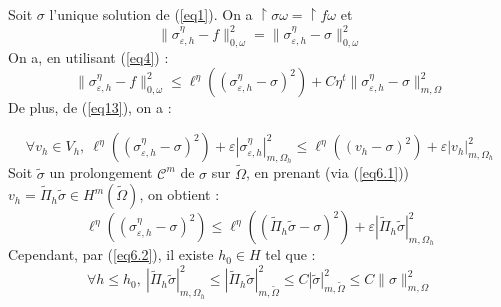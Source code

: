 \documentclass{article}
\begin{document}
\begin{dem}
Soit $\sigma$ l'unique solution de (\ref{eq1}). On a $\restriction{\sigma}{\omega}=\restriction{f}{\omega}$ et
	\[\|\sigma_{\varepsilon,h}^\eta -f\|_{0,\omega}^2=\|\sigma_{\varepsilon,h}^\eta -\sigma\|_{0,\omega}^2\]
On a, en utilisant (\ref{eq4}) : 
\begin{equation} \label{eq15} \|\sigma_{\varepsilon,h}^\eta -f\|_{0,\omega}^2\leq \ell^\eta \left( \left(\sigma_{\varepsilon, h}^\eta -\sigma\right)^2\right) + C\eta^t \|\sigma_{\varepsilon, h}^\eta -\sigma\|_{m,\Omega}^2 \end{equation}
De plus, de (\ref{eq13}), on a :

\begin{equation} \label{eq16} \forall v_h\in V_h,\ \ell^\eta\left( \left(\sigma_{\varepsilon, h}^\eta -\sigma\right)^2\right) + \varepsilon |\sigma^\eta_{\varepsilon, h}|^2_{m,\Omega_h}\leq \ell^\eta \left( \left(v_h -\sigma\right)^2\right) + \varepsilon |v_h|^2_{m,\Omega_h} \end{equation}
Soit $\tilde{\sigma}$ un prolongement $\mathscr{C}^m$ de $\sigma$ sur $\tilde{\Omega}$, en prenant (via (\ref{eq6.1})) $v_h=\tilde{\Pi}_h\tilde{\sigma}\in H^m(\tilde{\Omega})$, on obtient :
	\begin{equation} \label{eq17} \ell^\eta \left( \left(\sigma_{\varepsilon, h}^\eta -\sigma\right)^2\right)\leq \ell^\eta \left(\left(\tilde{\Pi}_h\tilde{\sigma}-\sigma\right)^2\right) + \varepsilon |\tilde{\Pi}_h\tilde{\sigma}|^2_{m,\Omega_h} \end{equation}
Cependant, par (\ref{eq6.2}), il existe $h_0\in H$ tel que : 
	\begin{equation} \label{eq18} \forall h\leq h_0,\ \left| \tilde{\Pi}_h\tilde{\sigma}\right|^2_{m,\Omega_h}\leq \left|\tilde{\Pi}_h\tilde{\sigma}\right|^2_{m,\tilde{\Omega}}\leq C|\tilde{\sigma}|^2_{m,\tilde{\Omega}}\leq C\|\sigma\|^2_{m,\Omega} \end{equation}


\end{dem}
\end{document}
